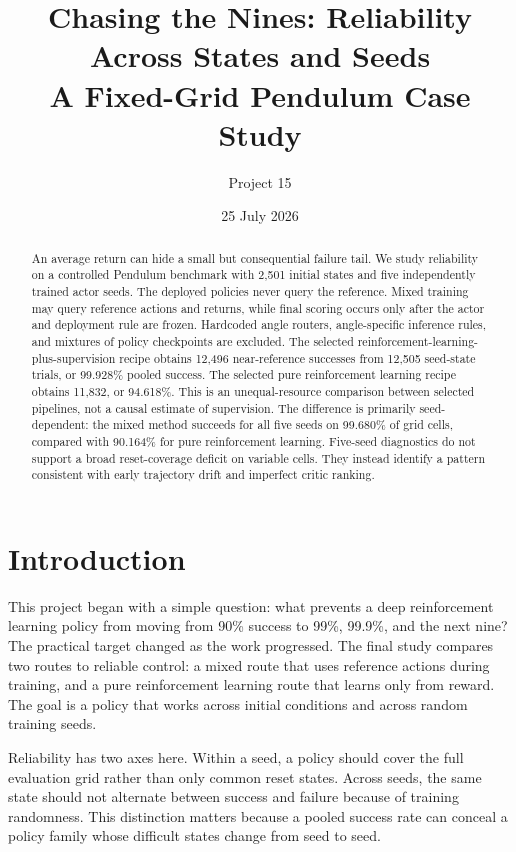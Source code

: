 \documentclass[10pt,twocolumn]{article}
\title{\vspace{-1.2em}\textbf{Chasing the Nines: Reliability Across States and Seeds}\\[-1mm]\large A Fixed-Grid Pendulum Case Study}
\author{Project 15}
\date{25 July 2026}
\begin{document}

\clearpage
\iffalse
\maketitle
\vspace{-1.6em}

\begin{abstract}
An average return can hide a small but consequential failure tail. We study reliability on a controlled Pendulum benchmark with 2,501 initial states and five independently trained actor seeds. The deployed policies never query the reference. Mixed training may query reference actions and returns, while final scoring occurs only after the actor and deployment rule are frozen. Hardcoded angle routers, angle-specific inference rules, and mixtures of policy checkpoints are excluded. The selected reinforcement-learning-plus-supervision recipe obtains 12,496 near-reference successes from 12,505 seed-state trials, or 99.928\% pooled success. The selected pure reinforcement learning recipe obtains 11,832, or 94.618\%. This is an unequal-resource comparison between selected pipelines, not a causal estimate of supervision. The difference is primarily seed-dependent: the mixed method succeeds for all five seeds on 99.680\% of grid cells, compared with 90.164\% for pure reinforcement learning. Five-seed diagnostics do not support a broad reset-coverage deficit on variable cells. They instead identify a pattern consistent with early trajectory drift and imperfect critic ranking.
\end{abstract}

\section{Introduction}

This project began with a simple question: what prevents a deep reinforcement learning policy from moving from 90\% success to 99\%, 99.9\%, and the next nine? The practical target changed as the work progressed. The final study compares two routes to reliable control: a mixed route that uses reference actions during training, and a pure reinforcement learning route that learns only from reward. The goal is a policy that works across initial conditions and across random training seeds.

Reliability has two axes here. Within a seed, a policy should cover the full evaluation grid rather than only common reset states. Across seeds, the same state should not alternate between success and failure because of training randomness. This distinction matters because a pooled success rate can conceal a policy family whose difficult states change from seed to seed.
\end{document}
